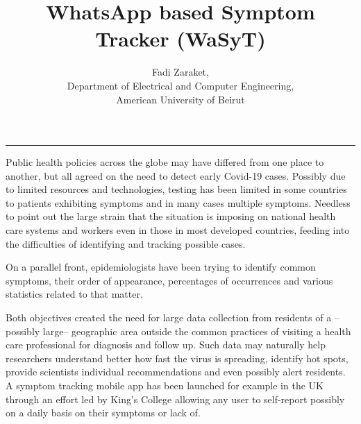 \documentclass[12pt, a4paper]{article}
\begin{document}
\title{WhatsApp based Symptom Tracker (WaSyT)}


\author{Fadi Zaraket, \\
  Department of Electrical and Computer Engineering, \\ 
  American University of Beirut}

\date{}

\maketitle

\thispagestyle{empty}

\bigskip \bigskip
\hrule
\bigskip \bigskip









Public health policies across the globe may have differed from one
place to another, but all agreed on the need to detect early Covid-19
cases. Possibly due to limited resources and technologies, testing has
been limited in some countries to patients exhibiting symptoms and in
many cases multiple symptoms. Needless to point out the large strain
that the situation is imposing on national health care systems and
workers even in those in most developed countries, feeding into the
difficulties of identifying and tracking possible cases.

On a parallel front, epidemiologists have been trying to identify
common symptoms, their order of appearance, percentages of occurrences
and various statistics related to that matter.

Both objectives created the need for large data collection from
residents of a --possibly large-- geographic area outside the common
practices of visiting a health care professional for diagnosis and
follow up. Such data may naturally help researchers understand better
how fast the virus is spreading, identify hot spots, provide
scientists individual recommendations and even possibly alert
residents. A symptom tracking mobile app has been launched for example
in the UK through an effort led by King's College allowing any user to
self-report possibly on a daily basis on their symptoms or lack of.
\end{document}
